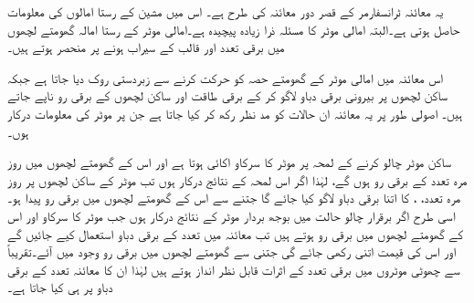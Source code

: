 یہ معائنہ ٹرانسفارمر کے قصر دور معائنہ کی طرح ہے۔ اس میں مشین کے رستا امالوں کی معلومات حاصل ہوتی ہے۔البتہ امالی موٹر کا مسئلہ ذرا زیادہ پیچیدہ ہے۔امالی موٹر کے رستا امالہ گھومتے لچھوں میں برقی تعدد اور قالب کے سیراب ہونے پر منحصر ہوتے ہیں۔

 اس معائنہ میں امالی موٹر کے گھومتے حصہ کو حرکت کرنے سے زبردستی روک دیا جاتا ہے جبکہ ساکن لچھوں پر بیرونی برقی دباو  لاگو کر کے برقی طاقت  اور ساکن لچھوں کے برقی رو  ناپے جاتے ہیں۔ اصولی طور پر یہ معائنہ ان حالات کو مد نظر رکھ کر کیا جاتا ہے جن پر موٹر کی معلومات درکار ہوں۔

ساکن موٹر چالو کرنے کے  لمحہ پر موٹر کا سرکاو اکائی ہوتا ہے اور اس کے گھومتے لچھوں میں  روز مرہ تعدد   کے برقی رو  ہوں گے، لہٰذا اگر اس لمحہ کے نتائج درکار ہوں تب موٹر کے ساکن لچھوں پر روز مرہ تعدد، ،   کا اتنا برقی دباو لاگو کیا جائے گا جتنے سے اس کے گھومتے لچھوں میں برقی رو  پیدا ہو۔ اسی طرح اگر برقرار چالو حالت میں بوجھ بردار موٹر کے نتائج درکار ہوں جب موٹر کا سرکاو  اور اس کے گھومتے لچھوں میں برقی رو  ہوتے ہیں تب معائنہ میں  تعدد کے برقی دباو استعمال کیے جائیں گے اور اس کی قیمت  اتنی رکھی جائے گی جتنی سے گھومتے لچھوں میں  برقی رو وجود میں آئے۔تقریباً   سے چھوٹی موٹروں میں برقی تعدد کے اثرات قابل نظر انداز ہوتے ہیں لہٰذا ان کا معائنہ  تعدد کے برقی دباو پر ہی کیا جاتا ہے۔

